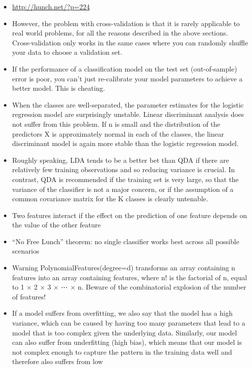 \documentclass[]{book}
\theoremstyle{definition}
\theoremstyle{definition}
\theoremstyle{definition}
\theoremstyle{remark}
\begin{document}
\begin{itemize}
\item
  \url{http://hunch.net/?p=224}
\item
  However, the problem with cross-validation is that it is rarely
  applicable to real world problems, for all the reasons described in
  the above sections. Cross-validation only works in the same cases
  where you can randomly shuffle your data to choose a validation set.
\item
  If the performance of a classification model on the test set
  (out-of-sample) error is poor, you can't just re-calibrate your model
  parameters to achieve a better model. This is cheating.
\item
  When the classes are well-separated, the parameter estimates for the
  logistic regression model are surprisingly unstable. Linear
  discriminant analysis does not suffer from this problem. If n is small
  and the distribution of the predictors X is approximately normal in
  each of the classes, the linear discriminant model is again more
  stable than the logistic regression model.
\item
  Roughly speaking, LDA tends to be a better bet than QDA if there are
  relatively few training observations and so reducing variance is
  crucial. In contrast, QDA is recommended if the training set is very
  large, so that the variance of the classifier is not a major concern,
  or if the assumption of a common covariance matrix for the K classes
  is clearly untenable.
\item
  Two features interact if the effect on the prediction of one feature
  depends on the value of the other feature
\item
  ``No Free Lunch'' theorem: no single classifier works best across all
  possible scenarios
\item
  Warning PolynomialFeatures(degree=d) transforms an array containing n
  features into an array containing features, where n! is the factorial
  of n, equal to 1 × 2 × 3 × ⋯ × n. Beware of the combinatorial
  explosion of the number of features!
\item
  If a model suffers from overfitting, we also say that the model has a
  high variance, which can be caused by having too many parameters that
  lead to a model that is too complex given the underlying data.
  Similarly, our model can also suffer from underfitting (high bias),
  which means that our model is not complex enough to capture the
  pattern in the training data well and therefore also suffers from low

\end{itemize}
\end{document}
